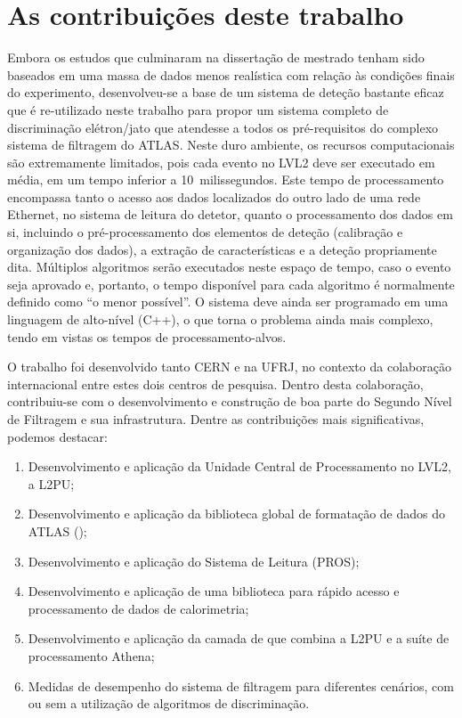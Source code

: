 \section{As contribuições deste trabalho}

Embora os estudos que culminaram na dissertação de mestrado tenham sido
baseados em uma massa de dados menos realística com relação às condições
finais do experimento, desenvolveu-se a base de um sistema de deteção bastante
eficaz que é re-utilizado neste trabalho para propor um sistema completo de
discriminação elétron/jato que atendesse a todos os pré-requisitos do complexo
sistema de filtragem do ATLAS. Neste duro ambiente, os recursos computacionais
são extremamente limitados, pois cada evento no LVL2 deve ser executado em
média, em um tempo inferior a 10~milissegundos. Este tempo de processamento
encompassa tanto o acesso aos dados localizados do outro lado de uma rede
Ethernet, no sistema de leitura do detetor, quanto o processamento dos dados
em si, incluindo o pré-processamento dos elementos de deteção (calibração e
organização dos dados), a extração de características e a deteção propriamente
dita. Múltiplos algoritmos serão executados neste espaço de tempo, caso o
evento seja aprovado e, portanto, o tempo disponível para cada algoritmo é
normalmente definido como ``o menor possível''. O sistema deve ainda ser
programado em uma linguagem de alto-nível (C++), o que torna o problema ainda
mais complexo, tendo em vistas os tempos de processamento-alvos.

O trabalho foi desenvolvido tanto CERN e na UFRJ, no contexto da colaboração
internacional entre estes dois centros de pesquisa. Dentro desta colaboração,
contribuiu-se com o desenvolvimento e construção de boa parte do Segundo Nível
de Filtragem e sua infrastrutura. Dentre as contribuições mais significativas,
podemos destacar:

\begin{enumerate}
\item Desenvolvimento e aplicação da Unidade Central de Processamento no
LVL2, a L2PU;
\item Desenvolvimento e aplicação da biblioteca global de formatação de dados
do ATLAS ();
\item Desenvolvimento e aplicação do  Sistema de Leitura (PROS);
\item Desenvolvimento e aplicação de uma biblioteca para rápido acesso e
processamento de dados de calorimetria;
\item Desenvolvimento e aplicação da camada de  que combina a
L2PU e a suíte de processamento  Athena;
\item Medidas de desempenho do sistema de filtragem para diferentes cenários,
com ou sem a utilização de algoritmos de discriminação.
\end{enumerate}

